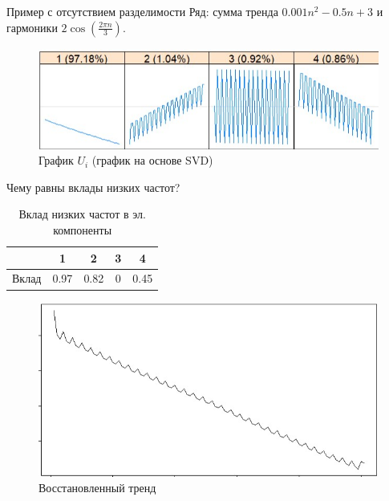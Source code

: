 \documentclass[ucs, notheorems, handout]{beamer}
\begin{document}
\begin{frame}{Пример с отсутствием разделимости}
    Ряд: сумма тренда $0.001n^2 - 0.5n + 3$ и гармоники $2 \cos(\frac{2 \pi n} {3})$.\\
    \pause
    \begin{figure}
      \begin{minipage}[c]{0.5\textwidth}
        \includegraphics[scale = 0.4]{ssa_example4.jpg}
      \end{minipage}\hfill
      \begin{minipage}[l]{0.5\textwidth}
        \caption{
           \footnotesize График $U_i$ (график на основе SVD)
        } \label{fig:03-03}
      \end{minipage}
    \end{figure}
    Чему равны вклады низких частот?\\
    \pause
    \begin{table}[h]
            \caption{\footnotesize Вклад низких частот в эл. компоненты}
            \footnotesize
            \begin{tabular}{|l | c| c| c| c|}
            \hline
             & 1 & 2 & 3 & 4\\
             \hline
             Вклад & 0.97 & 0.82 & 0 & 0.45 \\
            \hline
            \end{tabular}

        \end{table}

    \begin{figure}
      \begin{minipage}[l]{0.5\textwidth}
        \includegraphics[scale = 0.33]{ssa_example5.jpg}
      \end{minipage}\hfill
      \begin{minipage}[l]{0.5\textwidth}
        \caption{
           \footnotesize Восстановленный тренд
        } \label{fig:03-03}
      \end{minipage}
    \end{figure}


\end{frame}
\end{document}
